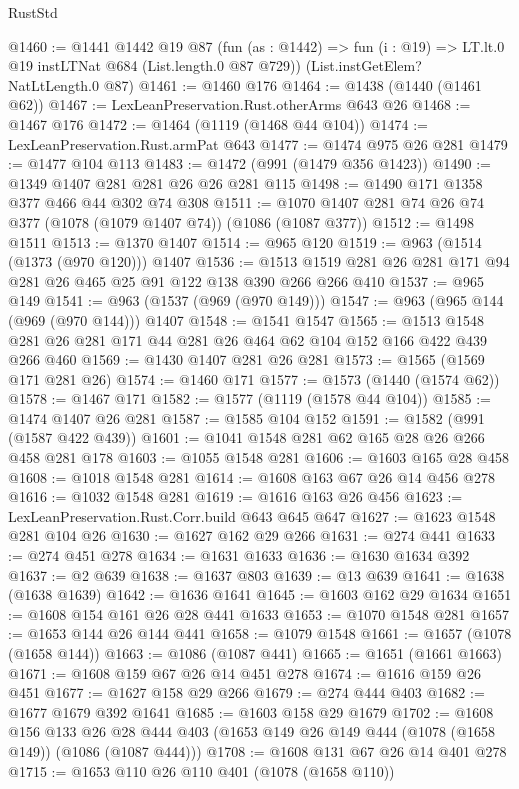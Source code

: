 \begin{lexlean}{RustStd}
\begin{coremodule}
{\begin{coremodule}
{{{{{{{@1460 := @1441
    @1442
    @19
    @87
    (fun (as : @1442) => fun (i : @19) => LT.lt.{0} @19 instLTNat @684 (List.length.{0} @87 @729))
    (List.instGetElem?NatLtLength.{0} @87)
@1461 := @1460 @176
@1464 := @1438 (@1440 (@1461 @62))
@1467 := LexLeanPreservation.Rust.otherArms @643 @26
@1468 := @1467 @176
@1472 := @1464 (@1119 (@1468 @44 @104))
@1474 := LexLeanPreservation.Rust.armPat @643
@1477 := @1474 @975 @26 @281
@1479 := @1477 @104 @113
@1483 := @1472 (@991 (@1479 @356 @1423))
@1490 := @1349 @1407 @281 @281 @26 @26 @281 @115
@1498 := @1490 @171 @1358 @377 @466 @44 @302 @74 @308
@1511 := @1070 @1407 @281 @74 @26 @74 @377 (@1078 (@1079 @1407 @74)) (@1086 (@1087 @377))
@1512 := @1498 @1511
@1513 := @1370 @1407
@1514 := @965 @120
@1519 := @963 (@1514 (@1373 (@970 @120))) @1407
@1536 := @1513 @1519 @281 @26 @281 @171 @94 @281 @26 @465 @25 @91 @122 @138 @390 @266 @266 @410
@1537 := @965 @149
@1541 := @963 (@1537 (@969 (@970 @149)))
@1547 := @963 (@965 @144 (@969 (@970 @144))) @1407
@1548 := @1541 @1547
@1565 := @1513 @1548 @281 @26 @281 @171 @44 @281 @26 @464 @62 @104 @152 @166 @422 @439 @266 @460
@1569 := @1430 @1407 @281 @26 @281
@1573 := @1565 (@1569 @171 @281 @26)
@1574 := @1460 @171
@1577 := @1573 (@1440 (@1574 @62))
@1578 := @1467 @171
@1582 := @1577 (@1119 (@1578 @44 @104))
@1585 := @1474 @1407 @26 @281
@1587 := @1585 @104 @152
@1591 := @1582 (@991 (@1587 @422 @439))
@1601 := @1041 @1548 @281 @62 @165 @28 @26 @266 @458 @281 @178
@1603 := @1055 @1548 @281
@1606 := @1603 @165 @28 @458
@1608 := @1018 @1548 @281
@1614 := @1608 @163 @67 @26 @14 @456 @278
@1616 := @1032 @1548 @281
@1619 := @1616 @163 @26 @456
@1623 := LexLeanPreservation.Rust.Corr.build @643 @645 @647
@1627 := @1623 @1548 @281 @104 @26
@1630 := @1627 @162 @29 @266
@1631 := @274 @441
@1633 := @274 @451 @278
@1634 := @1631 @1633
@1636 := @1630 @1634 @392
@1637 := @2 @639
@1638 := @1637 @803
@1639 := @13 @639
@1641 := @1638 (@1638 @1639)
@1642 := @1636 @1641
@1645 := @1603 @162 @29 @1634
@1651 := @1608 @154 @161 @26 @28 @441 @1633
@1653 := @1070 @1548 @281
@1657 := @1653 @144 @26 @144 @441
@1658 := @1079 @1548
@1661 := @1657 (@1078 (@1658 @144))
@1663 := @1086 (@1087 @441)
@1665 := @1651 (@1661 @1663)
@1671 := @1608 @159 @67 @26 @14 @451 @278
@1674 := @1616 @159 @26 @451
@1677 := @1627 @158 @29 @266
@1679 := @274 @444 @403
@1682 := @1677 @1679 @392 @1641
@1685 := @1603 @158 @29 @1679
@1702 := @1608
    @156
    @133
    @26
    @28
    @444
    @403
    (@1653 @149 @26 @149 @444 (@1078 (@1658 @149)) (@1086 (@1087 @444)))
@1708 := @1608 @131 @67 @26 @14 @401 @278
@1715 := @1653 @110 @26 @110 @401 (@1078 (@1658 @110))
}}}}}}}
\end{coremodule}}
\end{coremodule}
\end{lexlean}
